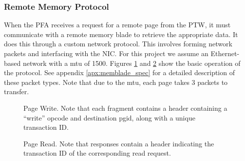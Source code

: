 \subsubsection{Remote Memory Protocol}
When the PFA receives a request for a remote page from the PTW, it must
communicate with a remote \gls{memory blade} to retrieve the appropriate data. It
does this through a custom network protocol. This involves forming network
packets and interfacing with the NIC. For this project we assume an
Ethernet-based network with a \gls{mtu} of \SI{1500}{\byte}.
Figures \ref{fig:write_protocol} and \ref{fig:read_protocol} show the basic
operation of the protocol. See appendix \ref{apx:memblade_spec} for a detailed
description of these packet types. Note that due to the \gls{mtu}, each page takes 3
packets to transfer.
\begin{figure}[h]
    \centering
    \begin{sequencediagram}
    \end{sequencediagram}
    \caption{Page Write. Note that each fragment contains a header containing a
    ``write'' opcode and destination \gls{pgid}, along with a unique
    transaction ID.}
		\label{fig:write_protocol}
\end{figure} 
 
\begin{figure}[h]
    \centering
    \begin{sequencediagram}
    \end{sequencediagram}
		\caption{Page Read. Note that responses contain a header indicating the
    transaction ID of the corresponding read request.}
		\label{fig:read_protocol}
\end{figure} 

